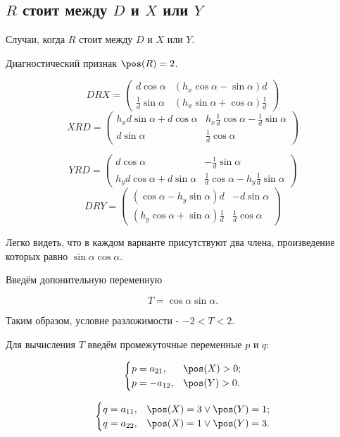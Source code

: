 \subsection{$R$ стоит между $D$ и $X$ или $Y$}

Случаи, когда $R$ стоит между $D$ и $X$ или $Y$.

Диагностический признак $\pos(R)=2$.

$$DRX = 
\begin{pmatrix}
	d\cos\alpha  & \left({h_x} \cos\alpha -\sin\alpha\right)  d\\
	\frac{1}{d} \sin\alpha  & \left({h_x} \sin\alpha +\cos\alpha\right)  \frac{1}{d}
\end{pmatrix}
$$
$$XRD = \begin{pmatrix}
	{h_x} d \sin\alpha + d \cos\alpha & {h_x} \frac{1}{d} \cos\alpha-\frac{1}{d} \sin\alpha\\
	d \sin\alpha & \frac{1}{d} \cos\alpha
\end{pmatrix}$$

$$YRD = \begin{pmatrix}
d \cos\alpha & -\frac{1}{d} \sin\alpha\\
{h_y} d \cos\alpha+d \sin\alpha & \frac{1}{d} \cos\alpha-{h_y} \frac{1}{d} \sin\alpha
\end{pmatrix}$$
$$DRY =
\begin{pmatrix}
\left( \cos\alpha-{h_y} \sin\alpha\right)  d & -d \sin\alpha\\
\left( {h_y} \cos\alpha+\sin\alpha\right)  \frac{1}{d} & \frac{1}{d} \cos\alpha
\end{pmatrix}
$$

Легко видеть, что в каждом варианте присутствуют два члена, произведение которых равно $\sin\alpha \cos\alpha$.

Введём допонительную переменную

$$T = \cos\alpha\sin\alpha.$$

Таким образом, условие разложимости - $-2<T<2$. 

Для вычисления $T$ введём промежуточные переменные $p$ и $q$:

$$\begin{cases}
	p = a_{21}, & \pos(X)>0;\\
	p = -a_{12}, & \pos(Y)>0.
\end{cases}$$

$$\begin{cases}
	q = a_{11}, & \pos(X)=3 \vee \pos(Y)=1;\\
	q = a_{22}, & \pos(X)=1 \vee \pos(Y)=3.
\end{cases}$$


